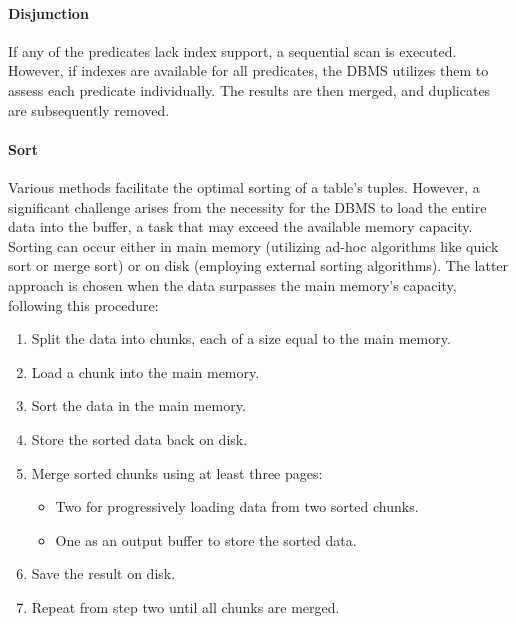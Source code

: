 \paragraph*{Disjunction}
If any of the predicates lack index support, a sequential scan is executed. 
However, if indexes are available for all predicates, the DBMS utilizes them to assess each predicate individually. 
The results are then merged, and duplicates are subsequently removed.

\paragraph*{Sort}
Various methods facilitate the optimal sorting of a table's tuples. 
However, a significant challenge arises from the necessity for the DBMS to load the entire data into the buffer, a task that may exceed the available memory capacity.
Sorting can occur either in main memory (utilizing ad-hoc algorithms like quick sort or merge sort) or on disk (employing external sorting algorithms).
The latter approach is chosen when the data surpasses the main memory's capacity, following this procedure:
\begin{enumerate}
    \item Split the data into chunks, each of a size equal to the main memory.
    \item Load a chunk into the main memory.
    \item Sort the data in the main memory.
    \item Store the sorted data back on disk.
    \item Merge sorted chunks using at least three pages:
        \begin{itemize}
            \item Two for progressively loading data from two sorted chunks.
            \item One as an output buffer to store the sorted data.
        \end{itemize}
    \item Save the result on disk.
    \item Repeat from step two until all chunks are merged.
\end{enumerate}

